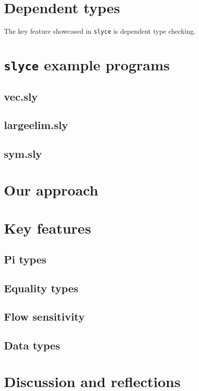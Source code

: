 


\section{Dependent types}
The key feature showcased in \texttt{slyce} is dependent type checking.

\section{\texttt{slyce} example programs}
\subsection{vec.sly}
\subsection{largeelim.sly}
\subsection{sym.sly}

\section{Our approach}





\section{Key features}
\subsection{Pi types}
\subsection{Equality types}
\subsection{Flow sensitivity}
\subsection{Data types}

\section{Discussion and reflections}

